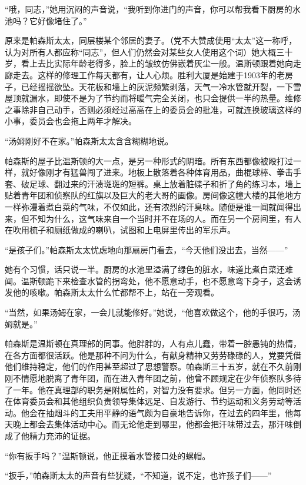 ``哦，同志，''她用沉闷的声音说，``我听到你进门的声音，你可以帮我看下厨房的水池吗？它好像堵住了。''

原来是帕森斯太太，同层楼某个邻居的妻子。（党不大赞成使用``太太''这一称呼，认为对所有人都应称``同志''，但人们仍然会对某些女人使用这个词）她大概三十岁，看上去比实际年龄老得多，脸上的皱纹仿佛嵌着灰尘一般。温斯顿跟着她向走廊走去。这样的修理工作每天都有，让人心烦。胜利大厦是始建于1903年的老房子，已经摇摇欲坠。天花板和墙上的灰泥频繁剥落，天气一冷水管就开裂，一下雪屋顶就漏水，即使不是为了节约而将暖气完全关闭，也只会提供一半的热量。维修之事除非自己动手，否则必须经过高高在上的委员会的批准，可就连换玻璃这样的小事，委员会也会拖上两年才解决。

``汤姆刚好不在家。''帕森斯太太含含糊糊地说。

帕森斯的屋子比温斯顿的大一点，是另一种形式的阴暗。所有东西都像被殴打过一样，就好像刚才有猛兽闯了进来。地板上散落着各种体育用品，曲棍球棒、拳击手套、破足球、翻过来的汗渍斑斑的短裤。桌上放着脏碟子和折了角的练习本，墙上贴着青年团和侦察队的红旗以及巨大的老大哥的画像。房间像这幢大楼的其他地方一样弥漫着煮白菜的气味，不仅如此，还有浓烈的汗臭味。随便是谁一闻就闻得出来，但不知为什么，这气味来自一个当时并不在场的人。而在另一个房间里，有人在吹用梳子和厕纸做成的喇叭，试图和上电屏里传出的军乐声。

``是孩子们。''帕森斯太太忧虑地向那扇房门看去，``今天他们没出去，当然——''

她有个习惯，话只说一半。厨房的水池里溢满了绿色的脏水，味道比煮白菜还难闻。温斯顿跪下来检查水管的拐弯处，他不愿意动手，也不愿意弯下身子，这会诱发他的咳嗽。帕森斯太太什么忙都帮不上，站在一旁观看。

``当然，如果汤姆在家，一会儿就能修好。''她说，``他喜欢做这个，他的手很巧，汤姆就是。''

帕森斯是温斯顿在真理部的同事。他胖胖的，人有点儿蠢，带着一腔愚钝的热情，在各方面都很活跃。他是那种不问为什么，有献身精神又劳劳碌碌的人，党要凭借他们维持稳定，他们的作用甚至超过了思想警察。帕森斯三十五岁，就在不久前刚刚不情愿地脱离了青年团，而在进入青年团之前，他曾不顾规定在少年侦察队多待了一年。他在真理部的职务是附属性的，对智力没有要求。但另一方面，他同时还在体育委员会和其他组织负责领导集体远足、自发游行、节约运动和义务劳动等活动。他会在抽烟斗的工夫用平静的语气颇为自豪地告诉你，在过去的四年里，他每天晚上都会去集体活动中心。而无论他走到哪里，他都会把汗味带过去，那汗味倒成了他精力充沛的证据。

``你有扳手吗？''温斯顿说，他正摸着水管接口处的螺帽。

``扳手，''帕森斯太太的声音有些犹疑，``不知道，说不定，也许孩子们——''

